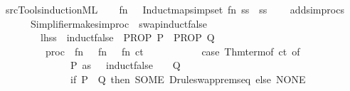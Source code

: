 \begin{isabellebody}
{\isacharparenright}{\kern0pt}\isanewline
{\isacartoucheclose}\isanewline
\isanewline
{}\isamarkupfalse%
\ {\isacartoucheopen}{\isachartilde}{\kern0pt}{\isachartilde}{\kern0pt}{\isacharslash}{\kern0pt}src{\isacharslash}{\kern0pt}Tools{\isacharslash}{\kern0pt}induction{\isachardot}{\kern0pt}ML{\isacartoucheclose}\isanewline
\isanewline
{}\isamarkupfalse%
\ {\isacartoucheopen}\isanewline
\ \ fn\ {\isacharunderscore}{\kern0pt}\ {\isacharequal}{\kern0pt}{\isachargreater}{\kern0pt}\ Induct{\isachardot}{\kern0pt}map{\isacharunderscore}{\kern0pt}simpset\ {\isacharparenleft}{\kern0pt}fn\ ss\ {\isacharequal}{\kern0pt}{\isachargreater}{\kern0pt}\ ss\isanewline
\ \ \ \ addsimprocs\isanewline
\ \ \ \ \ \ {\isacharbrackleft}{\kern0pt}Simplifier{\isachardot}{\kern0pt}make{\isacharunderscore}{\kern0pt}simproc\ \isactrlcontext \ {\isachardoublequote}{\kern0pt}swap{\isacharunderscore}{\kern0pt}induct{\isacharunderscore}{\kern0pt}false{\isachardoublequote}{\kern0pt}\isanewline
\ \ \ \ \ \ \ \ {\isacharbraceleft}{\kern0pt}lhss\ {\isacharequal}{\kern0pt}\ {\isacharbrackleft}{\kern0pt}\isactrlterm {\isasymopen}induct{\isacharunderscore}{\kern0pt}false\ {\isasymLongrightarrow}\ PROP\ P\ {\isasymLongrightarrow}\ PROP\ Q{\isasymclose}{\isacharbrackright}{\kern0pt}{\isacharcomma}{\kern0pt}\isanewline
\ \ \ \ \ \ \ \ \ proc\ {\isacharequal}{\kern0pt}\ fn\ {\isacharunderscore}{\kern0pt}\ {\isacharequal}{\kern0pt}{\isachargreater}{\kern0pt}\ fn\ {\isacharunderscore}{\kern0pt}\ {\isacharequal}{\kern0pt}{\isachargreater}{\kern0pt}\ fn\ ct\ {\isacharequal}{\kern0pt}{\isachargreater}{\kern0pt}\isanewline
\ \ \ \ \ \ \ \ \ \ {\isacharparenleft}{\kern0pt}case\ Thm{\isachardot}{\kern0pt}term{\isacharunderscore}{\kern0pt}of\ ct\ of\isanewline
\ \ \ \ \ \ \ \ \ \ \ \ {\isacharunderscore}{\kern0pt}\ {\isachardollar}{\kern0pt}\ {\isacharparenleft}{\kern0pt}P\ as\ {\isacharunderscore}{\kern0pt}\ {\isachardollar}{\kern0pt}\ \isactrlConstUNDERSCORE {\isasymopen}induct{\isacharunderscore}{\kern0pt}false{\isasymclose}{\isacharparenright}{\kern0pt}\ {\isachardollar}{\kern0pt}\ {\isacharparenleft}{\kern0pt}{\isacharunderscore}{\kern0pt}\ {\isachardollar}{\kern0pt}\ Q\ {\isachardollar}{\kern0pt}\ {\isacharunderscore}{\kern0pt}{\isacharparenright}{\kern0pt}\ {\isacharequal}{\kern0pt}{\isachargreater}{\kern0pt}\isanewline
\ \ \ \ \ \ \ \ \ \ \ \ \ \ if\ P\ {\isacharless}{\kern0pt}{\isachargreater}{\kern0pt}\ Q\ then\ SOME\ Drule{\isachardot}{\kern0pt}swap{\isacharunderscore}{\kern0pt}prems{\isacharunderscore}{\kern0pt}eq\ else\ NONE\isanewline

\end{isabellebody}
